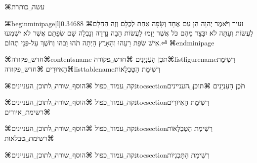 ⌘עשה␣כותרת



\hfill

⌘begin{minipage}[l]{0.34688\textwidth}
⌘זעיר
וַיֹּאמֶר יְהוָה הֵן עַם אֶחָד וְשָׂפָה אַחַת לְכֻלָּם וְזֶה הַחִלָּם
לַעֲשׂוֹת וְעַתָּה לֹא יִבָּצֵר מֵהֶם כֹּל אֲשֶׁר יָזְמוּ לַעֲשׂוֹת
הָבָה נֵרְדָה וְנָבְלָה שָׁם שְׂפָתָם אֲשֶׁר לֹא יִשְׁמְעוּ אִישׁ שְׂפַת
רֵעֵהוּ וְהָאָרֶץ הָיְתָה תֹהוּ וָבֹהוּ וְחֹשֶׁךְ עַל-פְּנֵי תְהוֹם.⏎
⌘end{minipage}



⌘חדש␣פקודה⌘contentsname{
  תֹּכֶן הָעִנְיָנִים
}
⌘חדש␣פקודה⌘listfigurename{רְשִׁימַת הָאִיּוּרִים}
⌘חדש␣פקודה⌘listtablename{רְשִׁימַת הַטַּבְלָאוֹת}  

⌘נקה␣עמוד␣כפול
⌘הוסף␣שורה␣לתוכן␣העניינים{toc}{section}{תֹּכֶן הָעִנְיָנִים}
⌘תוכן␣העניינים

⌘נקה␣עמוד␣כפול
⌘הוסף␣שורה␣לתוכן␣העניינים{toc}{section}{רְשִׁימַת הָאִיּוּרִים}
⌘רשימת␣איורים

⌘נקה␣עמוד␣כפול
⌘הוסף␣שורה␣לתוכן␣העניינים{toc}{section}{רְשִׁימַת הַטַּבְלָאוֹת}
⌘רשימת␣טבלאות

⌘נקה␣עמוד␣כפול
⌘הוסף␣שורה␣לתוכן␣העניינים{toc}{section}{רְשִׁימַת הַתָּכְנִיּוֹת}




